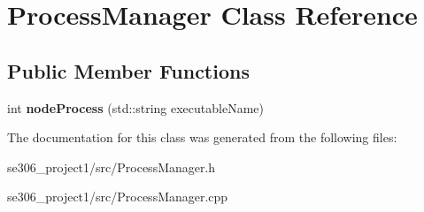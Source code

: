 \hypertarget{classProcessManager}{\section{Process\-Manager Class Reference}
\label{classProcessManager}
}
\subsection*{Public Member Functions}
\begin{DoxyCompactItemize}
\item 
\hypertarget{classProcessManager_a269c180832ffc1c3d2d34eeed37f41f7}{int {\bfseries node\-Process} (std\-::string executable\-Name)}\label{classProcessManager_a269c180832ffc1c3d2d34eeed37f41f7}

\end{DoxyCompactItemize}


The documentation for this class was generated from the following files\-:\begin{DoxyCompactItemize}
\item 
se306\-\_\-project1/src/Process\-Manager.\-h\item 
se306\-\_\-project1/src/Process\-Manager.\-cpp\end{DoxyCompactItemize}
